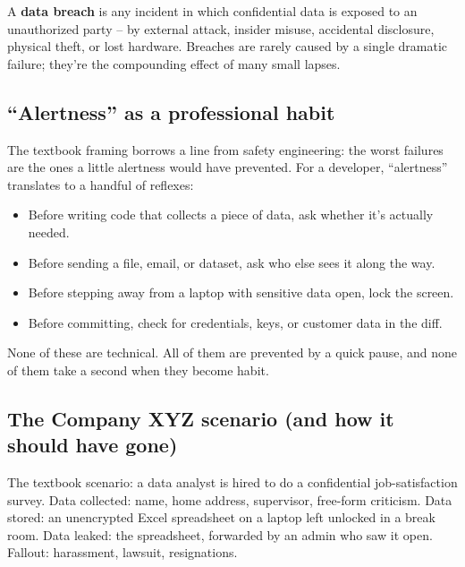 \documentclass[11pt]{article}
\begin{document}
\begin{defnbox}
A \textbf{data breach} is any incident in which confidential data is
exposed to an unauthorized party -- by external attack, insider
misuse, accidental disclosure, physical theft, or lost hardware.
Breaches are rarely caused by a single dramatic failure; they're the
compounding effect of many small lapses.
\end{defnbox}

\subsection{``Alertness'' as a professional habit}

The textbook framing borrows a line from safety engineering: the worst
failures are the ones a little alertness would have prevented. For a
developer, ``alertness'' translates to a handful of reflexes:

\begin{itemize}[leftmargin=*]
    \item Before writing code that collects a piece of data, ask
          whether it's actually needed.
    \item Before sending a file, email, or dataset, ask who else sees
          it along the way.
    \item Before stepping away from a laptop with sensitive data open,
          lock the screen.
    \item Before committing, check for credentials, keys, or customer
          data in the diff.
\end{itemize}

None of these are technical. All of them are prevented by a quick
pause, and none of them take a second when they become habit.

\subsection{The Company XYZ scenario (and how it should have gone)}

The textbook scenario: a data analyst is hired to do a confidential
job-satisfaction survey. Data collected: name, home address,
supervisor, free-form criticism. Data stored: an unencrypted Excel
spreadsheet on a laptop left unlocked in a break room. Data leaked:
the spreadsheet, forwarded by an admin who saw it open. Fallout:
harassment, lawsuit, resignations.
\end{document}
